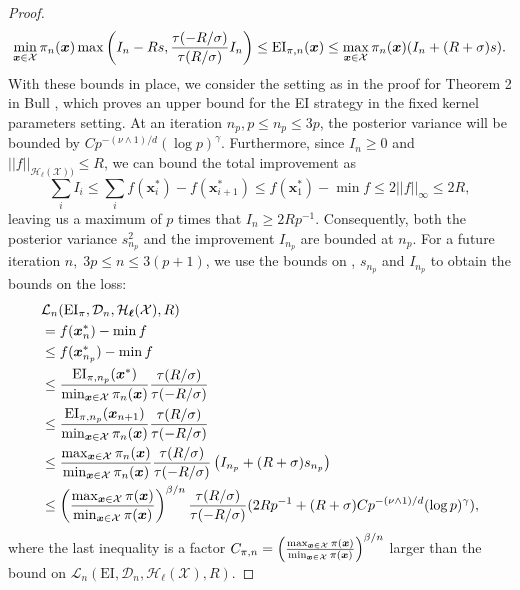 \begin{proof}
\begin{equation}
    {\min_{\bm{x}\in\mathcal{X}}{\pi}_n(\bm{x})}\max\left(I_n-Rs, \frac{\tau(-R/\sigma)}{\tau(R/\sigma)}I_n\right) \leq \text{EI}_{\pi,n}(\bm{x}) \leq {\max_{\bm{x}\in\mathcal{X}}{\pi}_n(\bm{x})} (I_n + (R + \sigma)s). 
\end{equation}
With these bounds in place, we consider the setting as in the proof for Theorem 2 in Bull \cite{JMLR:v12:bull11a}, which proves an upper bound for the EI strategy in the fixed kernel parameters setting. 
At an iteration $n_p, p \leq n_p \leq 3p$, the posterior variance will be bounded by $Cp^{-(\nu \land 1)/d}(\log p)^\gamma$. Furthermore, since $I_n \geq 0$ and $||f||_{\mathcal{H}_\ell(\mathcal{X}))} \leq R$, we can bound the total improvement as
\begin{equation}
    \sum_i I_i \leq \sum_i f(\bm{x}^*_{i}) - f(\bm{x}^*_{i+1}) \leq f(\bm{x}^*_1) - \min f \leq 2||f||_\infty \leq 2R,
\end{equation}
leaving us a maximum of $p$ times that $I_n \geq 2Rp^{-1}$. Consequently, both the posterior variance $s^2_{n_p}$ and the improvement $I_{n_p}$ are bounded at $n_p$. For a future iteration $n,\; 3p \leq n \leq 3(p+1)$, we use the  bounds on \pei, $s_{n_p}$ and $I_{n_p}$ to obtain the bounds on the \pei{} loss:
\begin{equation*} 
\begin{split}
    &\mathcal{L}_{n}(\text{EI}_{\pi}, \mathcal{D}_n, \mathcal{H}_{\bm{\ell}}(\mathcal{X}), R) \\
    &= f(\bm{x}_n^*) - \min f \\
    &\leq  f(\bm{x}_{n_p}^*) - \min f \\
    &\leq\frac{\text{EI}_{\pi,n_p}(\bm{x}^*)}{\min_{\bm{x}\in\mathcal{X}}{\pi}_n(\bm{x})}  \frac{\tau (R/\sigma)}{\tau (-R/\sigma)} \\
    &\leq
    \frac{\text{EI}_{\pi,n_p}(\bm{x}_{n+1})}{\min_{\bm{x}\in\mathcal{X}}{\pi}_n(\bm{x})}  \frac{\tau (R/\sigma)}{\tau (-R/\sigma)} \\
    &\leq\frac{\max_{\bm{x}\in\mathcal{X}}{\pi}_n(\bm{x})}{\min_{\bm{x}\in\mathcal{X}}{\pi}_n(\bm{x})}  \frac{\tau (R/\sigma)}{\tau (-R/\sigma)}
    \left(I_{n_p} + (R+\sigma)s_{n_p}\right)\\
    &\leq\left(\frac{\max_{\bm{x}\in\mathcal{X}}{\pi}(\bm{x})}{\min_{\bm{x}\in\mathcal{X}}{\pi}(\bm{x})}\right)^{\beta/n}  \frac{\tau (R/\sigma)}{\tau (-R/\sigma)} (2Rp^{-1} + (R+\sigma)Cp^{-(\nu \land 1)/d}(\log p)^\gamma),
\end{split}
\end{equation*}
where the last inequality 
is a factor $C_{{\pi}, n} = \left(\frac{\max_{\bm{x}\in\mathcal{X}}{\pi}(\bm{x})}{\min_{\bm{x}\in\mathcal{X}}{\pi}(\bm{x})}\right)^{\beta/n}$ larger than the bound on $\mathcal{L}_n(\text{EI}, \mathcal{D}_n, \mathcal{H}_{\bm{\ell}}(\mathcal{X}), R)$.
\end{proof} 


